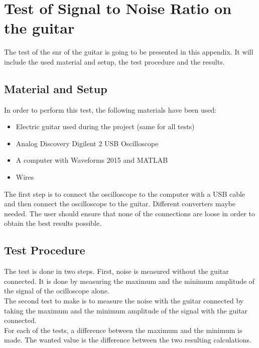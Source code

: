 \chapter{Test of Signal to Noise Ratio on the guitar}\label{app:test:snr}

The test of the \gls{snr} of the guitar is going to be presented in this appendix. It will include the used material and setup, the test procedure and the results. \\

\section{Material and Setup}

In order to perform this test, the following materials have been used:

\begin{itemize}
	\item Electric guitar used during the project (same for all tests)
	\item Analog Discovery Digilent 2 USB Oscilloscope
	\item A computer with Waveforms 2015 and MATLAB
	\item Wires
\end{itemize}


The first step is to connect the oscilloscope to the computer with a USB cable and then connect the oscilloscope to the guitar. Different converters maybe needed. The user should ensure that none of the connections are loose in order to obtain the best results possible. \\

\section{Test Procedure}

The test is done in two steps. First, noise is measured without the guitar connected. It is done by measuring the maximum and the minimum amplitude of the signal of the ocilloscope alone. \\

The second test to make is to measure the noise with the guitar connected by taking the maximum and the minimum amplitude of the signal with the guitar connected.  \\

For each of the tests, a difference between the maximum and the minimum is made. The wanted value is the difference between the two resulting calculations. \\

